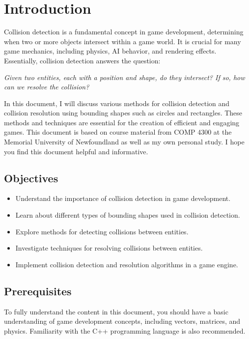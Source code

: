 \chapter{Introduction}
Collision detection is a fundamental concept in game development, determining
when two or more objects intersect within a game world. It is crucial for many
game mechanics, including physics, AI behavior, and rendering effects.
Essentially, collision detection answers the question:

\begin{displayquote}
    \textit{Given two entities, each with a position and shape, do they intersect? If so,
        how can we resolve the collision?}
\end{displayquote}

In this document, I will discuss various methods for collision detection and
collision resolution using bounding shapes such as circles and rectangles.
These methods and techniques are essential for the creation of efficient and
engaging games. This document is based on course material from COMP 4300 at the
Memorial University of Newfoundland as well as my own personal study. I hope
you find this document helpful and informative.

\section{Objectives}
\begin{itemize}
    \item Understand the importance of collision detection in game development.
    \item Learn about different types of bounding shapes used in collision detection.
    \item Explore methods for detecting collisions between entities.
    \item Investigate techniques for resolving collisions between entities.
    \item Implement collision detection and resolution algorithms in a game engine.
\end{itemize}

\section{Prerequisites}
To fully understand the content in this document, you should have a basic
understanding of game development concepts, including vectors, matrices, and
physics. Familiarity with the C++ programming language is also recommended.

